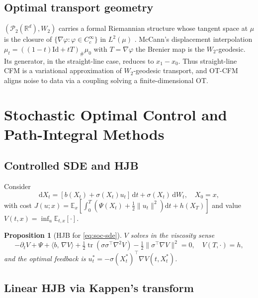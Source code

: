 \documentclass[11pt,letterpaper]{article}
\theoremstyle{plain}
\newtheorem{proposition}[theorem]{Proposition}
\theoremstyle{definition}
\theoremstyle{remark}
\newcommand{\R}{\mathbb{R}}
\newcommand{\E}{\mathbb{E}}
\newcommand{\dd}{\mathrm{d}}
\newcommand{\calP}{\mathcal{P}}
\newcommand{\tr}{\operatorname{tr}}
\newcommand{\grad}{\nabla}
\newcommand{\inner}[2]{\langle #1,\,#2\rangle}
\newcommand{\norm}[1]{\lVert #1\rVert}
\begin{document}
\subsection{Optimal transport geometry}

$(\calP_2(\R^d),W_2)$ carries a formal Riemannian structure whose tangent
space at $\mu$ is the closure of $\{\grad\varphi:\varphi\in C_c^\infty\}$ in
$L^2(\mu)$ \citep{otto2001geometry}. McCann's displacement interpolation
$\mu_t=((1-t)\mathrm{Id}+tT)_\#\mu_0$ with $T=\grad\varphi$ the Brenier
map is the $W_2$-geodesic. Its generator, in the straight-line case,
reduces to $x_1-x_0$. Thus straight-line CFM is a variational
approximation of $W_2$-geodesic transport, and OT-CFM
\citep{tong2023ot} aligns noise to data via a coupling solving a
finite-dimensional OT.

\section{Stochastic Optimal Control and Path-Integral Methods}\label{app:soc}

\subsection{Controlled SDE and HJB}

Consider
\begin{equation}
  \dd X_t=[b(X_t)+\sigma(X_t)u_t]\,\dd t+\sigma(X_t)\,\dd W_t,\quad X_0=x,
  \label{eq:soc-sde}
\end{equation}
with cost $J(u;x)=\E_x[\int_0^T(\Psi(X_t)+\tfrac12\norm{u_t}^2)\dd t+h(X_T)]$
and value $V(t,x)=\inf_u\E_{t,x}[\cdot]$.

\begin{proposition}[HJB for \eqref{eq:soc-sde}]\label{prop:soc-hjb}
$V$ solves in the viscosity sense
\begin{equation}
  -\partial_tV+\Psi+\inner{b}{\grad V}+\tfrac12\tr(\sigma\sigma^\top\nabla^2V)
  -\tfrac12\norm{\sigma^\top\grad V}^2=0,\quad V(T,\cdot)=h,
  \label{eq:soc-hjb}
\end{equation}
and the optimal feedback is $u_t^*=-\sigma(X_t^*)^\top\grad V(t,X_t^*)$.
\end{proposition}

\subsection{Linear HJB via Kappen's transform}
\end{document}
